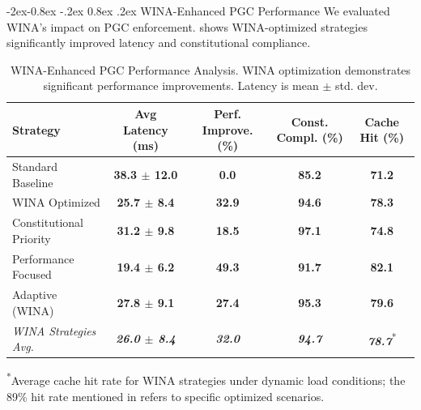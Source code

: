 \documentclass[manuscript,screen,review,anonymous,9pt]{acmart}
\makeatletter
\renewcommand\subsubsection{\@startsection{subsubsection}{3}{\z@}%
  {-2ex\@plus -0.8ex \@minus -.2ex}%
  {0.8ex \@plus .2ex}%
  {\normalfont\normalsize\bfseries}}
\newcommand{\tablesize}{\footnotesize}
\newcommand{\tablenumfmt}[1]{\textbf{#1}}
\newcommand{\tableheader}[1]{\textbf{#1}}
\makeatother
\begin{document}
\subsubsection{WINA-Enhanced PGC Performance}
\label{subsubsec:wina_performance_evaluation}
We evaluated WINA's impact on PGC enforcement.  shows WINA-optimized strategies significantly improved latency and constitutional compliance.
\begin{table}[htbp]
\centering
\caption{WINA-Enhanced PGC Performance Analysis. WINA optimization demonstrates significant performance improvements. Latency is mean $\pm$ std. dev.}
\label{tab:wina_pgc_performance}
\tablesize
\begin{tabular}{@{}lcccc@{}}
\toprule
\tableheader{Strategy} & \tableheader{Avg Latency (ms)} & \tableheader{Perf. Improve. (\%)} & \tableheader{Const. Compl. (\%)} & \tableheader{Cache Hit (\%)} \\
\midrule
Standard Baseline     & \tablenumfmt{38.3 $\pm$ 12.0} & \tablenumfmt{0.0}    & \tablenumfmt{85.2} & \tablenumfmt{71.2} \\
WINA Optimized        & \tablenumfmt{25.7 $\pm$ 8.4}  & \tablenumfmt{32.9}   & \tablenumfmt{94.6} & \tablenumfmt{78.3} \\
Constitutional Priority & \tablenumfmt{31.2 $\pm$ 9.8}  & \tablenumfmt{18.5}   & \tablenumfmt{97.1} & \tablenumfmt{74.8} \\
Performance Focused   & \tablenumfmt{19.4 $\pm$ 6.2}  & \tablenumfmt{49.3}   & \tablenumfmt{91.7} & \tablenumfmt{82.1} \\
Adaptive (WINA)       & \tablenumfmt{27.8 $\pm$ 9.1}  & \tablenumfmt{27.4}   & \tablenumfmt{95.3} & \tablenumfmt{79.6} \\
\midrule
\textit{WINA Strategies Avg.} & \textit{\tablenumfmt{26.0 $\pm$ 8.4}} & \textit{\tablenumfmt{32.0}} & \textit{\tablenumfmt{94.7}} & \textit{\tablenumfmt{78.7}}\textsuperscript{*} \\
\bottomrule
\end{tabular}
\begin{minipage}{\linewidth}\footnotesize \textsuperscript{*}Average cache hit rate for WINA strategies under dynamic load conditions; the 89\% hit rate mentioned in  refers to specific optimized scenarios.\end{minipage}
\end{table}
\end{document}
